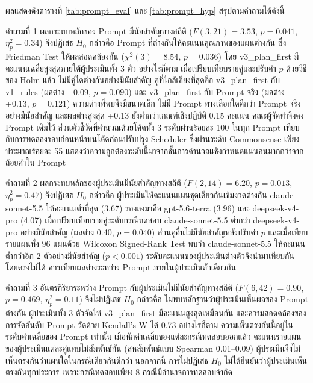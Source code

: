 ผลแสดงดังตารางที่ \ref{tab:prompt_eval} และ \ref{tab:prompt_hyp} สรุปตามคำถามได้ดังนี้

คำถามที่ 1 ผลกระทบหลักของ Prompt มีนัยสำคัญทางสถิติ ($F(3, 21) = 3.53$, $p = 0.041$, $\eta^2_p = 0.34$) จึงปฏิเสธ $H_0$ กล่าวคือ Prompt ที่ต่างกันให้คะแนนคุณภาพของแผนต่างกัน ซึ่ง Friedman Test ให้ผลสอดคล้องกัน ($\chi^2(3) = 8.54$, $p = 0.036$) โดย v3\_plan\_first มีคะแนนเฉลี่ยสูงสุดภายใต้ผู้ประเมินทั้ง 3 ตัว อย่างไรก็ตาม เมื่อเปรียบเทียบรายคู่และปรับค่า $p$ ด้วยวิธีของ Holm แล้ว ไม่มีคู่ใดต่างกันอย่างมีนัยสำคัญ คู่ที่ใกล้เคียงที่สุดคือ v3\_plan\_first กับ v1\_rules (ผลต่าง +0.09, $p = 0.090$) และ v3\_plan\_first กับ Prompt จริง (ผลต่าง +0.13, $p = 0.121$) ความต่างที่พบจึงมีขนาดเล็ก ไม่มี Prompt ทางเลือกใดดีกว่า Prompt จริงอย่างมีนัยสำคัญ และผลต่างสูงสุด +0.13 ยังต่ำกว่าเกณฑ์เชิงปฏิบัติ 0.15 คะแนน คณะผู้จัดทำจึงคง Prompt เดิมไว้ ส่วนตัวชี้วัดที่คำนวณด้วยโค้ดทั้ง 3 ระดับผ่านร้อยละ 100 ในทุก Prompt เทียบกับการทดลองรอบก่อนหน้าบนโค้ดก่อนปรับปรุง Scheduler ซึ่งผ่านระดับ Commonsense เพียงประมาณร้อยละ 55 แสดงว่าความถูกต้องระดับนี้มาจากชั้นการคำนวณเชิงกำหนดแน่นอนมากกว่าจากถ้อยคำใน Prompt

คำถามที่ 2 ผลกระทบหลักของผู้ประเมินมีนัยสำคัญทางสถิติ ($F(2, 14) = 6.20$, $p = 0.013$, $\eta^2_p = 0.47$) จึงปฏิเสธ $H_0$ กล่าวคือ ผู้ประเมินให้คะแนนแผนชุดเดียวกันเข้มงวดต่างกัน claude-sonnet-5.5 ให้คะแนนต่ำที่สุด (3.67) รองลงมาคือ gpt-5.6-terra (3.96) และ deepseek-v4-pro (4.07) เมื่อเปรียบเทียบรายคู่ระดับกรณีทดสอบ claude-sonnet-5.5 ต่ำกว่า deepseek-v4-pro อย่างมีนัยสำคัญ (ผลต่าง 0.40, $p = 0.040$) ส่วนคู่อื่นไม่มีนัยสำคัญหลังปรับค่า $p$ และเมื่อเทียบรายแผนทั้ง 96 แผนด้วย Wilcoxon Signed-Rank Test พบว่า claude-sonnet-5.5 ให้คะแนนต่ำกว่าอีก 2 ตัวอย่างมีนัยสำคัญ ($p < 0.001$) ระดับคะแนนของผู้ประเมินต่างตัวจึงนำมาเทียบกันโดยตรงไม่ได้ ควรเทียบผลต่างระหว่าง Prompt ภายในผู้ประเมินตัวเดียวกัน

คำถามที่ 3 อันตรกิริยาระหว่าง Prompt กับผู้ประเมินไม่มีนัยสำคัญทางสถิติ ($F(6, 42) = 0.90$, $p = 0.469$, $\eta^2_p = 0.11$) จึงไม่ปฏิเสธ $H_0$ กล่าวคือ ไม่พบหลักฐานว่าผู้ประเมินเห็นผลของ Prompt ต่างกัน ผู้ประเมินทั้ง 3 ตัวจัดให้ v3\_plan\_first มีคะแนนสูงสุดเหมือนกัน และความสอดคล้องของการจัดอันดับ Prompt วัดด้วย Kendall's W ได้ 0.73 อย่างไรก็ตาม ความเห็นตรงกันนี้อยู่ในระดับค่าเฉลี่ยของ Prompt เท่านั้น เมื่อหักค่าเฉลี่ยของแต่ละกรณีทดสอบออกแล้ว คะแนนรายแผนของผู้ประเมินแต่ละคู่แทบไม่สัมพันธ์กัน (สหสัมพันธ์แบบ Spearman 0.01--0.09) ผู้ประเมินจึงไม่เห็นตรงกันว่าแผนใดในกรณีเดียวกันดีกว่า นอกจากนี้ การไม่ปฏิเสธ $H_0$ ไม่ได้ยืนยันว่าผู้ประเมินเห็นตรงกันทุกประการ เพราะกรณีทดสอบเพียง 8 กรณีมีอำนาจการทดสอบจำกัด

